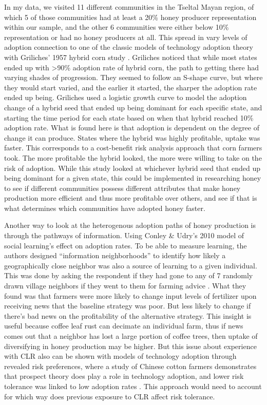 \documentclass[../main.tex]{subfiles}
\begin{document}
In my data, we visited 11 different communities in the Tseltal Mayan region, of which 5 of those communities had at least a 20\% honey producer representation within our sample, and the other 6 communities were either below 10\% representation or had no honey producers at all. This spread in vary levels of adoption connection to one of the classic models of technology adoption theory with Griliches’ 1957 hybrid corn study \parencite{griliches_hybrid_1957}. Griliches noticed that while most states ended up with >90\% adoption rate of hybrid corn, the path to getting there had varying shades of progression. They seemed to follow an S-shape curve, but where they would start varied, and the earlier it started, the sharper the adoption rate ended up being. Griliches used a logistic growth curve to model the adoption change of a hybrid seed that ended up being dominant for each specific state, and starting the time period for each state based on when that hybrid reached 10\% adoption rate. What is found here is that adoption is dependent on the degree of change it can produce. States where the hybrid was highly profitable, uptake was faster. This corresponds to a cost-benefit risk analysis approach that corn farmers took. The more profitable the hybrid looked, the more were willing to take on the risk of adoption. While this study looked at whichever hybrid seed that ended up being dominant for a given state, this could be implemented in researching honey to see if different communities possess different attributes that make honey production more efficient and thus more profitable over others, and see if that is what determines which communities have adopted honey faster.

Another way to look at the heterogenous adoption paths of honey production is through the pathways of information. Using Conley \& Udry’s 2010 model of social learning’s effect on adoption rates. To be able to measure learning, the authors designed “information neighborhoods” to identify how likely a geographically close neighbor was also a source of learning to a given individual. This was done by asking the respondent if they had gone to any of 7 randomly drawn village neighbors if they went to them for farming advice \parencite{conley_learning_2010}. What they found was that farmers were more likely to change input levels of fertilizer upon receiving news that the baseline strategy was poor. But less likely to change if there’s bad news on the profitability of the alternative strategy. This insight is useful because coffee leaf rust can decimate an individual farm, thus if news comes out that a neighbor has lost a large portion of coffee trees, then uptake of diversifying in honey production may be higher. But this issue about experience with CLR also can be shown with models of technology adoption through revealed risk preferences, where a study of Chinese cotton farmers demonstrates that prospect theory does play a role in technology adoption, and lower risk tolerance was linked to low adoption rates \parencite{liu_time_2013}. This approach would need to account for which way does previous exposure to CLR affect risk tolerance. 
\end{document}
